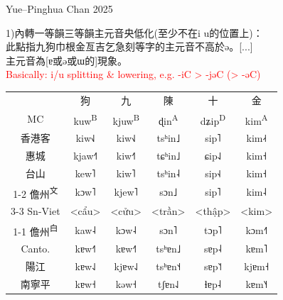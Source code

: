\documentclass{beamer}
\begin{document}
\begin{frame}[fragile]{Yue–Pinghua \scriptsize{Chan 2025}}

{\small 
1)內轉一等韻三等韻主元音央低化(至少不在i u的位置上)：\\
此點指九狗巾根金亙吉乞急刻等字的主元音不高於ǝ。[...]\\
主元音為[ɐ或ə或ɯ的]現象。\\
\smallskip
\textcolor{red}{Basically: i/u splitting \& lowering, e.g. -iC > -jəC (> -əC)}\\
\begin{table}
    \flushleft
    \begin{tabular}{c|c c c c c}
         & 狗 & 九 & 陳 & 十 & 金\\
        MC & kuw\textsuperscript{B} & kjuw\textsuperscript{B} & ɖin\textsuperscript{A} & dʑip\textsuperscript{D} & kim\textsuperscript{A}\\ \hline
        香港客 & kiw˧˩ & kiw˧˩ & tsʰin˩ & sip˥ & kim˨˧\\
        惠城 & kjaw˧˥ & kiw˧˥ & tɕʰin˩ & ɕip˨˩ & kim˧\\
        台山 & kew˥ & kiw˥ & tsʰin˨ & sip˧˨ & kim˧\\ \cline{1-2} \cline{4-4}
        儋州\textsuperscript{文} & \multicolumn{1}{c|}{kɔw˥} & \multicolumn{1}{c|}{kjew˥} & \multicolumn{1}{c|}{sɔn˩} & sip˥ & kim˨\\ \cline{3-3} \cline{5-5}
        Sn-Viet & <cẩu> & <cửu> & <trần> & \multicolumn{1}{c|}{<thập>} & <kim> \\ \cline{1-1} \cline{6-6}
        儋州\textsuperscript{白} & kaw˨ & kɔw˨ & sɔn˥ & tɔp˥ & kɔm˧˥\\
        Canto. & kɐw˧˥ & kɐw˧˥ & tsʰɐn˩ & sɐp˨ & kɐm˥\\
        陽江 & kɐw˨˩ & kjɐw˨˩ & tsʰɐn˦˧ & sɐp˥˦ & kjɐm˧\\
        南寧平 & kɐw˧ & kəw˧ & tʃɐn˨˩ & ɬɐp˨ & kɐm˥˧\\     
    \end{tabular}
\end{table}
}
\end{frame}
\end{document}
